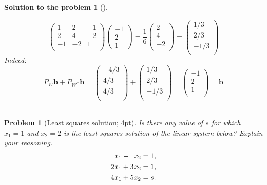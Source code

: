 \documentclass[12pt,a4]{article}
\newtheorem{problem}{Problem}
\newtheorem{solution}{Solution to the problem}
\newcommand{\bb}{{\mathbf b}}
\begin{document}
\begin{solution}[]
\begin{enumerate}[(a)]
\[\begin{pmatrix}
1 & 2 & -1 \\
2 & 4 & -2\\
-1 & -2 & 1 \\
\end{pmatrix}
\begin{pmatrix}
-1 \\ 2 \\ 1
\end{pmatrix}
= \frac{1}{6}
\begin{pmatrix}
 2 \\ 
 4 \\ 
-2 \\ 
\end{pmatrix} = 
\begin{pmatrix}
 1/3 \\ 
 2/3 \\ 
-1/3 \\ 
\end{pmatrix}
\]
Indeed:
\[
P_W\bb + P_{W^\top}\bb = 
 \begin{pmatrix}
-4/3 \\ 
 4/3 \\ 
 4/3 \\ 
\end{pmatrix}
+
\begin{pmatrix}
 1/3 \\ 
 2/3 \\ 
-1/3 \\ 
\end{pmatrix}
=
\begin{pmatrix}
 -1 \\ 
 2 \\ 
1 \\ 
\end{pmatrix}
= \bb 
\]\\
\end{enumerate}
\end{solution}



\begin{problem}[Least squares solution; 4pt]\rm
	Is there any value of $s$ for which $x_1=1$ and $x_2=2$ is the least squares solution of the linear
	system below?	Explain your reasoning. \\ [-10pt]
	\begin{align*}
	x_1 - \hphantom{4}x_2 & = 1,\\ 2x_1 + 3x_2 & = 1,\\ 4x_1 + 5x_2 & = s.
	\end{align*}
\vspace*{-10pt}
\end{problem}
\end{document}
